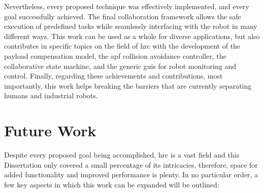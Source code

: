 \par Nevertheless, every proposed technique was effectively implemented, and every goal successfully achieved. The final collaboration framework allows the safe execution of predefined tasks while seamlessly interfacing with the robot in many different ways. This work can be used as a whole for diverse applications, but also contributes in specific topics on the field of \ac{hrc} with the development of the payload compensation model, the \ac{apf} collision avoidance controller, the collaborative state machine, and the generic \acp{gui} for robot monitoring and control. Finally, regarding these achievements and contributions, most importantly, this work helps breaking the barriers that are currently separating humans and industrial robots.





\section{Future Work}

\par Despite every proposed goal being accomplished, \ac{hrc} is a vast field and this Dissertation only covered a small percentage of its intricacies, therefore, space for added functionality and improved performance is plenty. In no particular order, a few key aspects in which this work can be expanded will be outlined:

